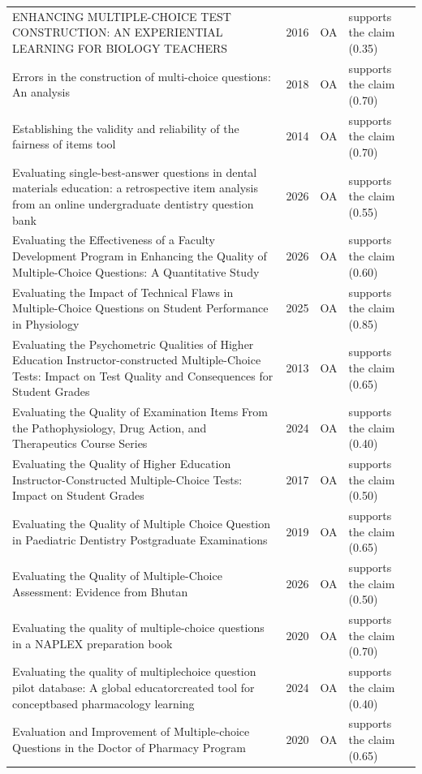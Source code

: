 \begin{longtable}{@{}%
  >{\raggedright\arraybackslash}p{}c%
  >{\raggedright\arraybackslash}p{}%
  >{\raggedright\arraybackslash}p{}@{}}
ENHANCING MULTIPLE-CHOICE TEST CONSTRUCTION: AN EXPERIENTIAL LEARNING FOR BIOLOGY TEACHERS & 2016 & OA & supports the claim (0.35) \\
Errors in the construction of multi-choice questions: An analysis & 2018 & OA & supports the claim (0.70) \\
Establishing the validity and reliability of the fairness of items tool & 2014 & OA & supports the claim (0.70) \\
Evaluating single-best-answer questions in dental materials education: a retrospective item analysis from an online undergraduate dentistry question bank & 2026 & OA & supports the claim (0.55) \\
Evaluating the Effectiveness of a Faculty Development Program in Enhancing the Quality of Multiple-Choice Questions: A Quantitative Study & 2026 & OA & supports the claim (0.60) \\
Evaluating the Impact of Technical Flaws in Multiple-Choice Questions on Student Performance in Physiology & 2025 & OA & supports the claim (0.85) \\
Evaluating the Psychometric Qualities of Higher Education Instructor-constructed Multiple-Choice Tests: Impact on Test Quality and Consequences for Student Grades & 2013 & OA & supports the claim (0.65) \\
Evaluating the Quality of Examination Items From the Pathophysiology, Drug Action, and Therapeutics Course Series & 2024 & OA & supports the claim (0.40) \\
Evaluating the Quality of Higher Education Instructor-Constructed Multiple-Choice Tests: Impact on Student Grades & 2017 & OA & supports the claim (0.50) \\
Evaluating the Quality of Multiple Choice Question in Paediatric Dentistry Postgraduate Examinations & 2019 & OA & supports the claim (0.65) \\
Evaluating the Quality of Multiple-Choice Assessment: Evidence from Bhutan & 2026 & OA & supports the claim (0.50) \\
Evaluating the quality of multiple-choice questions in a NAPLEX preparation book & 2020 & OA & supports the claim (0.70) \\
Evaluating the quality of multiplechoice question pilot database: A global educatorcreated tool for conceptbased pharmacology learning & 2024 & OA & supports the claim (0.40) \\
Evaluation and Improvement of Multiple-choice Questions in the Doctor of Pharmacy Program & 2020 & OA & supports the claim (0.65) \\

\end{longtable}
